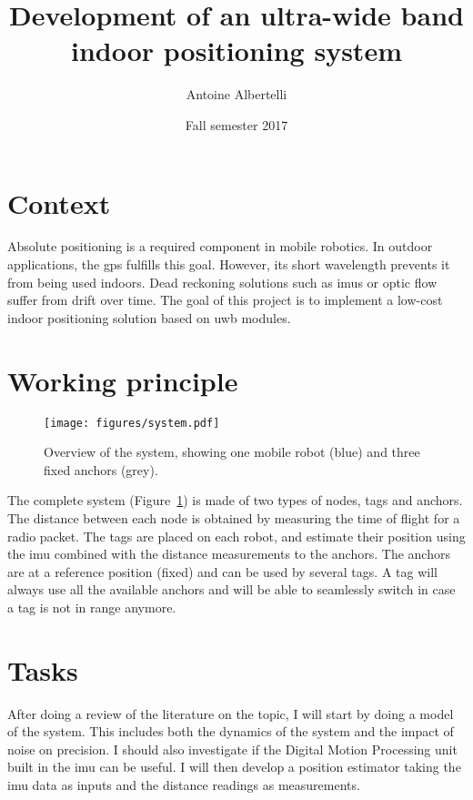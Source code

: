 \documentclass[a4paper,twocolumn]{article}
\date{Fall semester 2017}
\title{Development of an ultra-wide band indoor positioning system}
\author{Antoine Albertelli}
\begin{document}
\maketitle
{}

\section{Context}

Absolute positioning is a required component in mobile robotics.
In outdoor applications, the \gls{gps} fulfills this goal.
However, its short wavelength prevents it from being used indoors.
Dead reckoning solutions such as \glspl{imu} or optic flow suffer from drift over time.
The goal of this project is to implement a low-cost indoor positioning solution based on \gls{uwb} modules.

\section{Working principle}

\begin{figure}[h!]
    \centering
    \texttt{[image: figures/system.pdf]}
    \caption{Overview of the system, showing one mobile robot (blue) and three fixed anchors (grey).}
    \label{fig:system}
\end{figure}

The complete system (Figure~\ref{fig:system}) is made of two types of nodes, tags and anchors.
The distance between each node is obtained by measuring the time of flight for a radio packet.
The tags are placed on each robot, and estimate their position using the \gls{imu} combined with the distance measurements to the anchors.
The anchors are at a reference position (fixed) and can be used by several tags.
A tag will always use all the available anchors and will be able to seamlessly switch in case a tag is not in range anymore.

\section{Tasks}

After doing a review of the literature on the topic, I will start by doing a model of the system.
This includes both the dynamics of the system and the impact of noise on precision.
I should also investigate if the Digital Motion Processing unit built in the \gls{imu} can be useful.
I will then develop a position estimator taking the \gls{imu} data as inputs and the distance readings as measurements.
\end{document}
